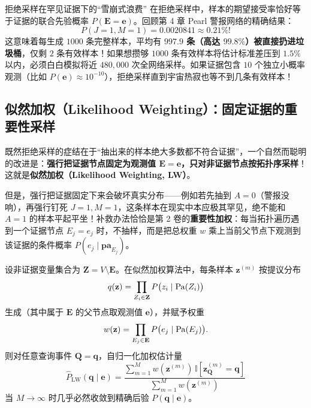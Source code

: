 \begin{failBox}{拒绝采样在罕见证据下的“雪崩式浪费”}
在拒绝采样中，样本的期望接受率恰好等于证据的联合先验概率 $P(\mathbf{E}=\mathbf{e})$。回顾第 4 章 Pearl 警报网络的精确结果：
\[
  P(J=1, M=1) = 0.0020841 \approx 0.21\%!
\]
这意味着每生成 $1000$ 条完整样本，平均有 \textbf{$997.9$ 条（高达 $99.8\%$）被直接扔进垃圾桶}，仅剩 $2$ 条有效样本！如果想攒够 $1000$ 条有效样本将估计标准差压到 $1.5\%$ 以内，必须白白模拟将近 $480{,}000$ 次全网络采样。如果证据包含 $10$ 个独立小概率观测（比如 $P(\mathbf{e}) \approx 10^{-10}$），拒绝采样直到宇宙热寂也等不到几条有效样本！
\end{failBox}

\subsection{似然加权（Likelihood Weighting）：固定证据的重要性采样}

既然拒绝采样的症结在于“抽出来的样本绝大多数都不符合证据”，一个自然而聪明的改进是：\textbf{强行把证据节点固定为观测值 $\mathbf{E}=\mathbf{e}$，只对非证据节点按拓扑序采样}！这就是\textbf{似然加权（Likelihood Weighting, LW）}。

但是，强行把证据固定下来会破坏真实分布——例如若先抽到 $A=0$（警报没响），再强行钉死 $J=1, M=1$，这条样本在现实中本应极其罕见，绝不能和 $A=1$ 的样本平起平坐！补救办法恰恰是第 2 卷的\textbf{重要性加权}：每当拓扑遍历遇到一个证据节点 $E_j = e_j$ 时，不抽样，而是把总权重 $w$ 乘上当前父节点下观测到该证据的条件概率 $P(e_j \mid \mathbf{pa}_{E_j})$。

\begin{thmBox}
\begin{proposition}[似然加权的无偏性与一致性]\label{prop:lw}
设非证据变量集合为 $\mathbf{Z} = V \setminus \mathbf{E}$。在似然加权算法中，每条样本 $\mathbf{z}^{(m)}$ 按提议分布
\[
  q(\mathbf{z}) = \prod_{Z_i \in \mathbf{Z}} P\big(z_i \mid \operatorname{Pa}(Z_i)\big)
\]
生成（其中属于 $\mathbf{E}$ 的父节点取观测值 $\mathbf{e}$），并赋予权重
\begin{equation}\label{eq:lw-weight}
  w(\mathbf{z}) = \prod_{E_j \in \mathbf{E}} P\big(e_j \mid \operatorname{Pa}(E_j)\big).
\end{equation}
则对任意查询事件 $\mathbf{Q}=\mathbf{q}$，自归一化加权估计量
\[
  \hat{P}_{\text{LW}}(\mathbf{q} \mid \mathbf{e})
  = \frac{\sum_{m=1}^M w(\mathbf{z}^{(m)})\, \mathbb{I}[\mathbf{z}^{(m)}_{\mathbf{Q}} = \mathbf{q}]}{\sum_{m=1}^M w(\mathbf{z}^{(m)})}
\]
当 $M \to \infty$ 时几乎必然收敛到精确后验 $P(\mathbf{q} \mid \mathbf{e})$。
\end{proposition}
\end{thmBox}

